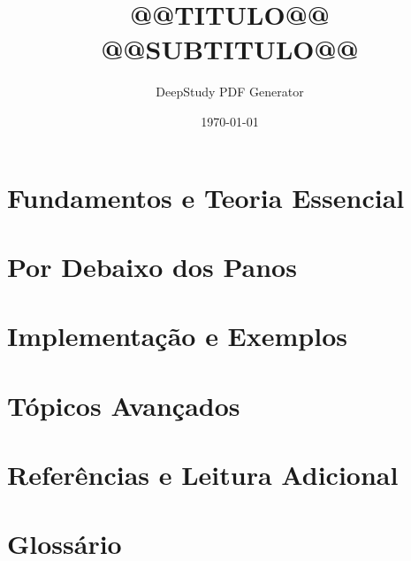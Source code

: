 \documentclass[12pt,a4paper,oneside]{book}
\title{@@TITULO@@\\[0.4em]\Large @@SUBTITULO@@}
\author{DeepStudy PDF Generator}
\date{\today}
\begin{document}
\maketitle
\tableofcontents

\chapter{Fundamentos e Teoria Essencial}

\chapter{Por Debaixo dos Panos}

\chapter{Implementação e Exemplos}

\chapter{Tópicos Avançados}

\appendix
\chapter{Referências e Leitura Adicional}

\chapter{Glossário}

\printindex
\end{document}
